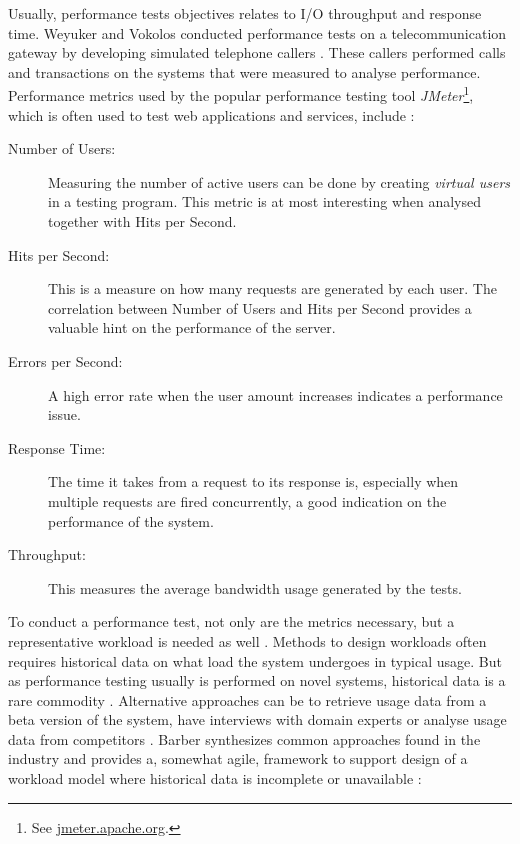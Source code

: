 Usually, performance tests objectives relates to I/O throughput and response
time. Weyuker and Vokolos conducted performance tests on a telecommunication
gateway by developing simulated telephone callers \cite{weyuker2000experience}.
These callers performed calls and transactions on the systems that were
measured to analyse performance. Performance metrics used by the popular
performance testing tool \textit{JMeter}\footnote{See
\url{jmeter.apache.org}.}, which is often used to test web applications and
services, include \cite{mendelawy2016kpis}:

\begin{description}
  \item[Number of Users:] Measuring the number of active users can be done by
    creating \textit{virtual users} in a testing program. This metric is at
    most interesting when analysed together with Hits per Second.
  \item[Hits per Second:] This is a measure on how many requests are generated
    by each user. The correlation between Number of Users and Hits per Second
    provides a valuable hint on the performance of the server.
  \item[Errors per Second:] A high error rate when the user amount increases
    indicates a performance issue.
  \item[Response Time:] The time it takes from a request to its response is,
    especially when multiple requests are fired concurrently, a good indication
    on the performance of the system.
  \item[Throughput:] This measures the average bandwidth usage generated by the
    tests.
\end{description}

To conduct a performance test, not only are the metrics necessary, but a
representative workload is needed as well \cite{weyuker2000experience}.
Methods to design workloads often requires historical data on what load the
system undergoes in typical usage. But as performance testing usually is
performed on novel systems, historical data is a rare commodity
\cite{barber2004creating}. Alternative approaches can be to retrieve usage data
from a beta version of the system, have interviews with domain experts or
analyse usage data from competitors \cite{jiang2015survey}. Barber synthesizes
common approaches found in the industry and provides a, somewhat agile,
framework to support design of a workload model where historical data is
incomplete or unavailable \cite{barber2004creating}:

